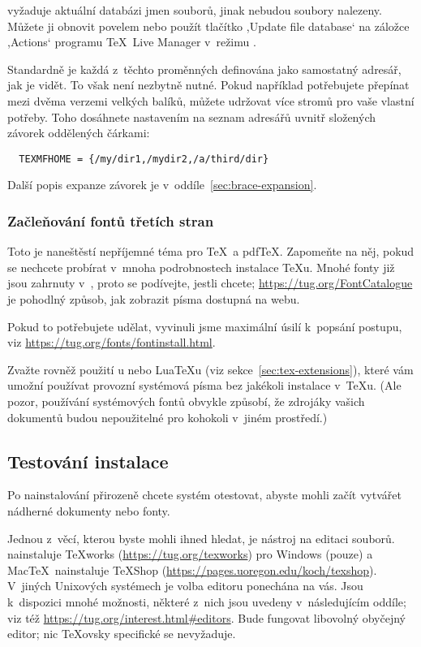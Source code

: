 \documentclass[\classoptions,slovak,english,czech]{\classname}
\newcommand{\singleuv}[1]{,#1`}
\begin{document}
 vyžaduje aktuální databázi jmen souborů, jinak
nebudou soubory nalezeny.
Můžete ji obnovit povelem  nebo použít tlačítko
\singleuv{Update file database} na záložce \singleuv{Actions} programu
\TeX\ Live Manager v~režimu \GUI.

Standardně je každá z~těchto proměnných definována jako 
samostatný adresář, jak je vidět. To však není nezbytně nutné. 
Pokud například potřebujete přepínat mezi dvěma verzemi velkých
balíků, můžete udržovat více stromů pro vaše vlastní potřeby.  
Toho dosáhnete nastavením  na seznam adresářů uvnitř 
složených závorek oddělených čárkami:

\begin{verbatim}
  TEXMFHOME = {/my/dir1,/mydir2,/a/third/dir}
\end{verbatim}

Další popis expanze závorek je v~oddíle~\ref{sec:brace-expansion}.

\subsubsection{Začleňování fontů třetích stran}

Toto je naneštěstí nepříjemné téma pro \TeX\ a pdf\TeX. Zapomeňte na něj, 
pokud se nechcete probírat v~mnoha podrobnostech instalace \TeX u. Mnohé fonty již jsou zahrnuty v~\TL, proto
se podívejte, jestli chcete; \url{https://tug.org/FontCatalogue} je pohodlný
způsob, jak zobrazit písma dostupná na webu.

Pokud to potřebujete udělat, vyvinuli jsme maximální úsilí 
k~popsání postupu, viz \url{https://tug.org/fonts/fontinstall.html}.

Zvažte rovněž použití \XeTeX{}u nebo Lua\TeX{}u (viz
sekce~\ref{sec:tex-extensions}), které vám umožní používat provozní
systémová písma bez jakékoli instalace v~\TeX{}u. (Ale pozor, používání
systémových fontů obvykle způsobí, že zdrojáky vašich dokumentů budou nepoužitelné pro kohokoli v~jiném prostředí.) 

\subsection{Testování instalace}
\label{sec:test.install}

Po nainstalování \TL{} přirozeně chcete
systém otestovat, abyste mohli začít vytvářet nádherné dokumenty nebo fonty.

Jednou z~věcí, kterou byste mohli ihned hledat, je nástroj na editaci
souborů.  \TL{} nainstaluje \TeX{}works (\url{https://tug.org/texworks})
pro Windows (pouze) a Mac\TeX\ nainstaluje TeXShop
(\url{https://pages.uoregon.edu/koch/texshop}).  V~jiných Unixových systémech
je volba editoru ponechána na vás. Jsou k~dispozici mnohé možnosti, 
některé z~nich jsou uvedeny v~následujícím oddíle; viz
též \url{https://tug.org/interest.html#editors}. Bude fungovat libovolný
obyčejný editor; nic \TeX{}ovsky specifické se nevyžaduje.
\end{document}
